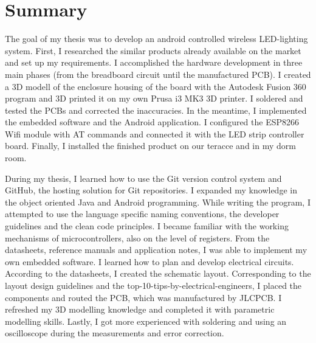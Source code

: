 \documentclass[../main.tex]{subfiles}
\begin{document}
{}
\section*{Summary}
    The goal of my thesis was to develop an android controlled wireless LED-lighting system. First, I researched the similar products already available on the market and set up my requirements. I accomplished the hardware development in three main phases (from the breadboard circuit until the manufactured PCB). 
    I created a 3D modell of the enclosure housing of the board with the Autodesk Fusion 360 program and 3D printed it on my own Prusa i3 MK3 3D printer. I soldered and tested the PCBs and corrected the inaccuracies. 
    In the meantime, I implemented the embedded software and the Android application. I configured the ESP8266 Wifi module with AT commands and connected it with the LED strip controller board. Finally, I installed the finished product on our teracce and in my dorm room.
    
    During my thesis, I learned how to use the Git version control system and GitHub, the hosting solution for Git repositories. 
    I expanded my knowledge in the object oriented Java and Android programming. While writing the program, I attempted to use the language specific naming conventions, the developer guidelines and the clean code principles. I became familiar with the working mechanisms of microcontrollers, also on the level of registers. From the datasheets, reference manuals and application notes, I was able to implement my own embedded software.
    I learned how to plan and develop electrical circuits. According to the datasheets, I created the schematic layout. Corresponding to the layout design guidelines and the top-10-tips-by-electrical-engineers, I placed the components and routed the PCB, which was manufactured by JLCPCB. I refreshed my 3D modelling knowledge and completed it with parametric modelling skills. Lastly, I got more experienced with soldering and using an oscilloscope during the measurements and error correction.
\end{document}
